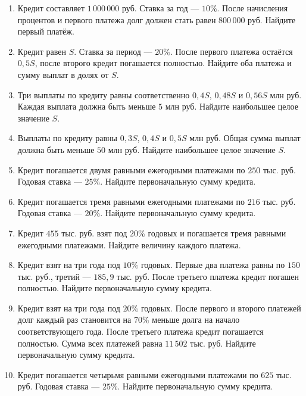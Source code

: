 \documentclass[a4paper,12pt]{article}
\begin{document}
\begin{enumerate}[label=\textbf{\arabic*.}]
\item Кредит составляет $1\,000\,000$ руб. Ставка за год --- $10\%$. После начисления процентов и первого платежа долг должен стать равен $800\,000$ руб. Найдите первый платёж.

\item Кредит равен $S$. Ставка за период --- $20\%$. После первого платежа остаётся $0{,}5S$, после второго кредит погашается полностью. Найдите оба платежа и сумму выплат в долях от $S$.

\item Три выплаты по кредиту равны соответственно $0{,}4S$, $0{,}48S$ и $0{,}56S$ млн руб. Каждая выплата должна быть меньше $5$ млн руб. Найдите наибольшее целое значение $S$.

\item Выплаты по кредиту равны $0{,}3S$, $0{,}4S$ и $0{,}5S$ млн руб. Общая сумма выплат должна быть меньше $50$ млн руб. Найдите наибольшее целое значение $S$.

\item Кредит погашается двумя равными ежегодными платежами по $250$ тыс. руб. Годовая ставка --- $25\%$. Найдите первоначальную сумму кредита.

\item Кредит погашается тремя равными ежегодными платежами по $216$ тыс. руб. Годовая ставка --- $20\%$. Найдите первоначальную сумму кредита.

\item Кредит $455$ тыс. руб. взят под $20\%$ годовых и погашается тремя равными ежегодными платежами. Найдите величину каждого платежа.

\item Кредит взят на три года под $10\%$ годовых. Первые два платежа равны по $150$ тыс. руб., третий --- $185{,}9$ тыс. руб. После третьего платежа кредит погашен полностью. Найдите первоначальную сумму кредита.

\item Кредит взят на три года под $20\%$ годовых. После первого и второго платежей долг каждый раз становится на $70\%$ меньше долга на начало соответствующего года. После третьего платежа кредит погашается полностью. Сумма всех платежей равна $11\,502$ тыс. руб. Найдите первоначальную сумму кредита.

\item Кредит погашается четырьмя равными ежегодными платежами по $625$ тыс. руб. Годовая ставка --- $25\%$. Найдите первоначальную сумму кредита.
\end{enumerate}
\end{document}
